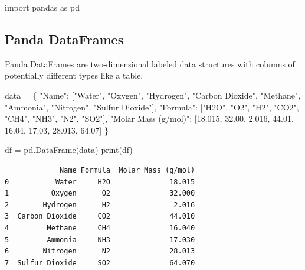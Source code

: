 \documentclass[
  letterpaper,
  DIV=11,
  numbers=noendperiod]{scrreprt}
\newenvironment{Shaded}{\begin{snugshade}}{\end{snugshade}}
\newcommand{\BuiltInTok}[1]{\textcolor[rgb]{0.00,0.23,0.31}{#1}}
\newcommand{\FloatTok}[1]{\textcolor[rgb]{0.68,0.00,0.00}{#1}}
\newcommand{\ImportTok}[1]{\textcolor[rgb]{0.00,0.46,0.62}{#1}}
\newcommand{\NormalTok}[1]{\textcolor[rgb]{0.00,0.23,0.31}{#1}}
\newcommand{\OperatorTok}[1]{\textcolor[rgb]{0.37,0.37,0.37}{#1}}
\newcommand{\StringTok}[1]{\textcolor[rgb]{0.13,0.47,0.30}{#1}}
\begin{document}
\begin{Shaded}
\begin{Highlighting}[]
\ImportTok{import}\NormalTok{ pandas }\ImportTok{as}\NormalTok{ pd}
\end{Highlighting}
\end{Shaded}

\subsection*{Panda DataFrames}\label{panda-dataframes}

Panda DataFrames are two-dimensional labeled data structures with
columns of potentially different types like a table.

\begin{Shaded}
\begin{Highlighting}[]
\NormalTok{data }\OperatorTok{=}\NormalTok{ \{}
    \StringTok{"Name"}\NormalTok{: [}\StringTok{"Water"}\NormalTok{, }\StringTok{"Oxygen"}\NormalTok{, }\StringTok{"Hydrogen"}\NormalTok{, }\StringTok{"Carbon Dioxide"}\NormalTok{, }\StringTok{"Methane"}\NormalTok{, }\StringTok{"Ammonia"}\NormalTok{, }\StringTok{"Nitrogen"}\NormalTok{, }\StringTok{"Sulfur Dioxide"}\NormalTok{],}
    \StringTok{"Formula"}\NormalTok{: [}\StringTok{"H2O"}\NormalTok{, }\StringTok{"O2"}\NormalTok{, }\StringTok{"H2"}\NormalTok{, }\StringTok{"CO2"}\NormalTok{, }\StringTok{"CH4"}\NormalTok{, }\StringTok{"NH3"}\NormalTok{, }\StringTok{"N2"}\NormalTok{, }\StringTok{"SO2"}\NormalTok{],}
    \StringTok{"Molar Mass (g/mol)"}\NormalTok{: [}\FloatTok{18.015}\NormalTok{, }\FloatTok{32.00}\NormalTok{, }\FloatTok{2.016}\NormalTok{, }\FloatTok{44.01}\NormalTok{, }\FloatTok{16.04}\NormalTok{, }\FloatTok{17.03}\NormalTok{, }\FloatTok{28.013}\NormalTok{, }\FloatTok{64.07}\NormalTok{]}
\NormalTok{\}}

\NormalTok{df }\OperatorTok{=}\NormalTok{ pd.DataFrame(data)}
\BuiltInTok{print}\NormalTok{(df)}
\end{Highlighting}
\end{Shaded}

\begin{verbatim}
             Name Formula  Molar Mass (g/mol)
0           Water     H2O              18.015
1          Oxygen      O2              32.000
2        Hydrogen      H2               2.016
3  Carbon Dioxide     CO2              44.010
4         Methane     CH4              16.040
5         Ammonia     NH3              17.030
6        Nitrogen      N2              28.013
7  Sulfur Dioxide     SO2              64.070
\end{verbatim}
\end{document}

